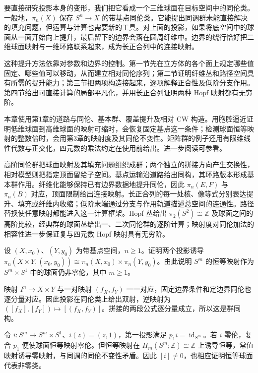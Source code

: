 \ProseParagraphBreak

要直接研究投影本身的变形，我们把它看成一个三维球面在目标空间中的同伦类。一般地，\(\pi_n(X)\) 保存 \(S^n\to X\) 的带基点同伦类。它能提出同调群未能直接解决的填充问题，但运算与计算也需要新的工具。对上面的投影，如果将底空间中的球面从一面开始向上提升，最后留下的边界会落在圆周纤维中。边界的绕行恰好把二维球面映射与一维环路联系起来，成为长正合列中的连接映射。

\ProseParagraphBreak

这种提升方法依靠对参数和边界的控制。第一节先在立方体的各个面上规定哪些值固定、哪些值可以移动，从而建立相对同伦序列；第二节证明纤维丛和路径空间具有所需的提升能力；第三节把两项构造接起来，逐项解释正合性及低阶分支作用。第四节给出可直接计算的局部平凡化，并用长正合列证明两种 Hopf 映射都有无穷阶。

\ProseParagraphBreak

本章使用第1章的道路与同伦、基本群、覆盖提升及相对 CW 构造。用胞腔逼近证明低维球面到高维球面的映射可缩时，会恢复固定基点这一条件；检测球面恒等映射的整数倍时，会用第3章的映射度及其同伦不变性。矩阵群的例子还用有限维线性代数与正交化，四元数的乘法约定在使用前给出。进一步阅读可参看\cite[第4.1节；第4.2节，Fiber Bundles]{Hatcher2002}。






\begin{chaptersummary}
	高阶同伦群把球面映射及其填充问题组织成群；两个独立的拼接方向产生交换性，相对模型则把指定顶面留给子空间。基点运输沿道路给出同构，其环路版本形成基本群作用。纤维化能够保持已有边界数据地提升同伦，因此 \(\pi_n(E,F)\) 与 \(\pi_n(B)\) 对应，顶面限制给出连接映射。长正合列的每一处核、像等式分别表达提升、填充或纤维内收缩；低阶末端通过分支与作用轨道描述总空间的连通性。路径替换使任意映射都能进入这一计算框架。Hopf 丛给出 \(\pi_2(S^2)\cong\mathbb Z\) 及球面之间的高阶比较，经典群的球面丛给出一、二次同伦群的逐阶计算；映射度对同伦加法的相容性进一步保证复与四元数 Hopf 映射具有无穷阶。
\end{chaptersummary}

\BookExercises

\begin{exercise}\label{g2:ex:homotopy-product-retract}
	设 \((X,x_0)\)、\((Y,y_0)\) 为带基点空间，\(n\ge1\)。证明两个投影诱导 \(\pi_n(X\times Y,(x_0,y_0))\cong\pi_n(X,x_0)\times\pi_n(Y,y_0)\)。由此说明 \(S^m\) 的恒等映射作为 \(S^m\times S^1\) 中的球面仍非零伦，其中 \(m\ge1\)。
\end{exercise}
\begin{solution}
	映射 \(I^n\to X\times Y\) 与一对映射 \((f_X,f_Y)\) 一一对应，固定边界条件和定边界同伦也逐分量对应。因此投影在同伦类上给出双射，逆映射为 \(([f_X],[f_Y])\mapsto[(f_X,f_Y)]\)。拼接的两段公式逐分量成立，所以这是群同构。

	令 \(i:S^m\to S^m\times S^1\)、\(i(z)=(z,1)\)，第一投影满足 \(p_1i=\operatorname{id}_{S^m}\)。若 \(i\) 零伦，复合 \(p_1\) 便使球面恒等映射零伦。但恒等映射在 \(H_m(S^m;\mathbb Z)\cong\mathbb Z\) 上诱导恒等，常值映射诱导零映射，与同调的同伦不变性矛盾。因此 \([i]\ne0\)，也相应证明恒等球面代表非零类。
\end{solution}

